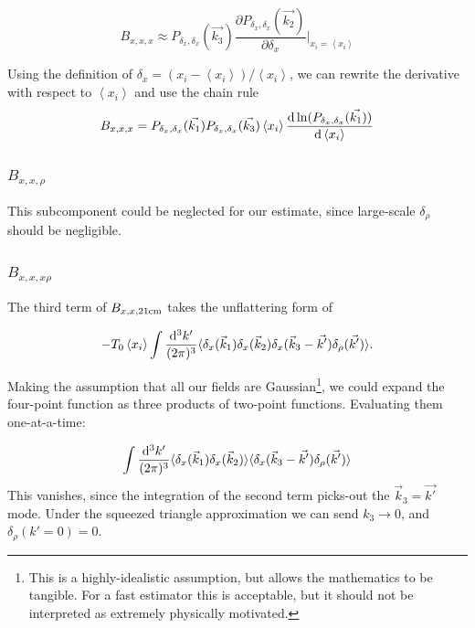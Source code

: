 \begin{equation}
B_{x,x,x} \approx P_{\delta_x,\delta_x}(\vec{k_3}) \frac{\partial P_{\delta_x,\delta_x}(\vec{k_2}) }{\partial\delta_x}|_{x_i = \left\langle x_i \right\rangle}
\end{equation}

Using the definition of $\delta_x = (x_i - \left\langle x_i \right\rangle)/\left\langle x_i \right\rangle$, we can rewrite the derivative with respect to $\left\langle x_i \right\rangle$ and use the chain rule
\begin{equation}
B_{x,x,x} = P_{\delta_x,\delta_x}(\vec{k_1}) P_{\delta_x,\delta_x}(\vec{k_3}) \left\langle x_i \right\rangle \frac{{\rm d} \ln (P_{\delta_x,\delta_x}(\vec{k_1}))}{{\rm d}\left\langle x_i \right\rangle}
\end{equation}

\subsubsection*{$B_{x,x,\rho}$}
\label{subsubsec:Bxxrho}
This subcomponent could be neglected for our estimate, since large-scale $\delta_{\rho}$ should be negligible.

\subsubsection*{$B_{x,x,x\rho}$}
\label{subsubsec:B_xxxrho}
The third term of $B_{x,x,{\rm 21cm}}$ takes the unflattering form of

\begin{equation}
- T_0 \left\langle x_i \right\rangle \int \frac{{\rm d^3}k'}{(2\pi)^3} 
\langle \delta_x(\vec{k}_1) \delta_x(\vec{k}_2) \delta_x(\vec{k}_3 - \vec{k'})\delta_{\rho}(\vec{k'}) \rangle .
\end{equation}

Making the assumption that all our fields are Gaussian\footnote{This is a highly-idealistic assumption, but allows the mathematics to be tangible. For a fast estimator this is acceptable, but it should not be interpreted as extremely physically motivated.}, we could expand the four-point function as three products of two-point functions. Evaluating them one-at-a-time:

\begin{equation}
\int \frac{{\rm d^3}k'}{(2\pi)^3} \langle \delta_x(\vec{k}_1) \delta_x(\vec{k}_2) \rangle \langle \delta_x(\vec{k}_3 - \vec{k'})\delta_{\rho}(\vec{k'}) \rangle
\end{equation}
This vanishes, since the integration of the second term picks-out the $\vec{k}_3 = \vec{k'}$ mode. Under the squeezed triangle approximation we can send $k_3 \rightarrow 0$, and $\delta_{\rho}(k'=0)=0$.

